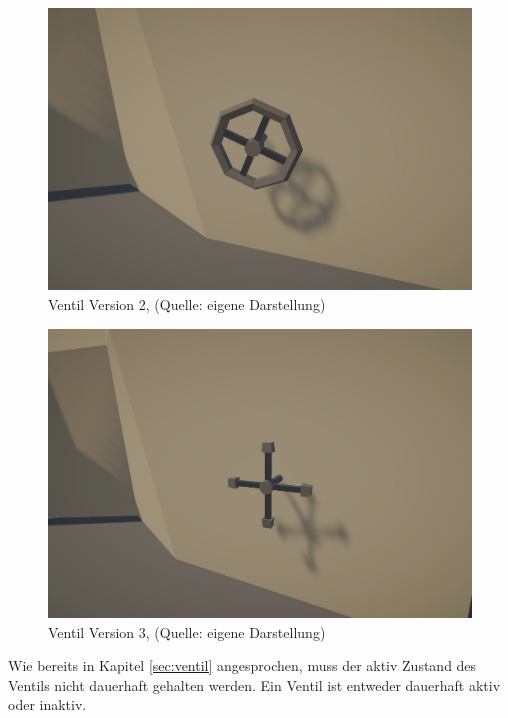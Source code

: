 \begin{figure}[ht]
\centering
\includegraphics[width=0.8\linewidth]{content/pictures/Vault_02.jpg}
\caption{Ventil Version 2, (Quelle: eigene Darstellung)}
\label{fig:valve_02}
\end{figure}

\begin{figure}[ht]
\centering
\includegraphics[width=0.8\linewidth]{content/pictures/Vault_03.jpg}
\caption{Ventil Version 3, (Quelle: eigene Darstellung)}
\label{fig:valve_03}
\end{figure}

Wie bereits in Kapitel \ref{sec:ventil}  angesprochen, muss der aktiv Zustand des Ventils nicht dauerhaft gehalten werden. Ein Ventil ist entweder dauerhaft aktiv oder inaktiv.

